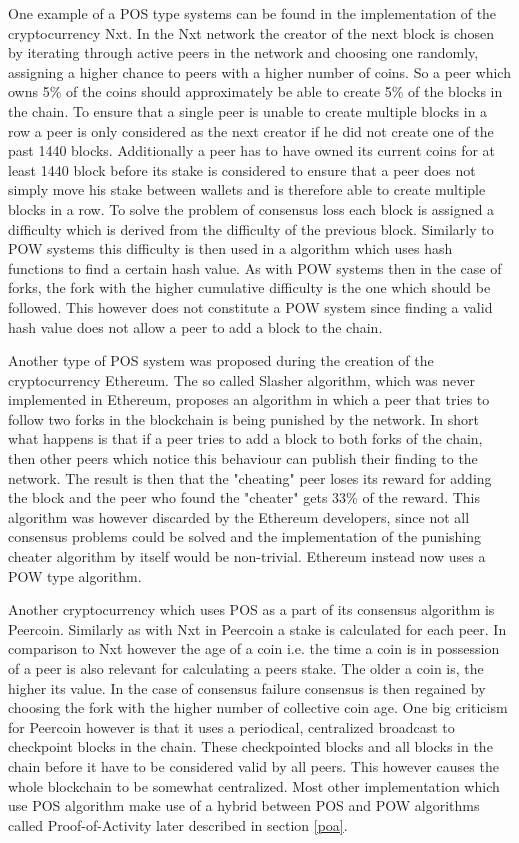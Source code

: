 One example of a POS type systems can be found in the implementation of the cryptocurrency Nxt. In the Nxt network the creator of the next block is chosen by iterating through active peers in the
network and choosing one randomly, assigning a higher chance to peers with a higher number of coins. So a peer which owns 5\% of the coins should approximately be able to create 5\% of the blocks
in the chain. To ensure that a single peer is unable to create multiple blocks in a row a peer is only considered as the next creator if he did not create one of the past 1440 blocks. Additionally
a peer has to have owned its current coins for at least 1440 block before its stake is considered to ensure that a peer does not simply move his stake between wallets and is therefore able to create
multiple blocks in a row. To solve the problem of consensus loss each block is assigned a difficulty which is derived from the difficulty of the previous block. Similarly to POW systems this
difficulty is then used in a algorithm which uses hash functions to find a certain hash value. As with POW systems then in the case of forks, the fork with the higher cumulative difficulty is
the one which should be followed. This however does not constitute a POW system since finding a valid hash value does not allow a peer to add a block to the chain.\cite{url:nxt}\par
Another type of POS system was proposed during the creation of the cryptocurrency Ethereum. The so called Slasher algorithm, which was never implemented in Ethereum, proposes an algorithm in
which a peer that tries to follow two forks in the blockchain is being punished by the network. In short what happens is that if a peer tries to add a block to both forks of the chain, then
other peers which notice this behaviour can publish their finding to the network. The result is then that the "cheating" peer loses its reward for adding the block and the peer who found the
"cheater" gets 33\% of the reward.\cite{url:eth_slash} This algorithm was however discarded by the Ethereum developers, since not all consensus problems could be solved and the implementation of the punishing cheater
algorithm by itself would be non-trivial.\cite{url:eth_no_slash} Ethereum instead now uses a POW type algorithm.\cite{url:eth_pow}\par
Another cryptocurrency which uses POS as a part of its consensus algorithm is Peercoin. Similarly as with Nxt in Peercoin a stake is calculated for each peer. In comparison to Nxt however the age
of a coin i.e. the time a coin is in possession of a peer is also relevant for calculating a peers stake. The older a coin is, the higher its value. In the case of consensus failure consensus is then
regained by choosing the fork with the higher number of collective coin age.\cite{url:peercoin} One big criticism for Peercoin however is that it uses a periodical, centralized broadcast to checkpoint blocks in the chain.
These checkpointed blocks and all blocks in the chain before it have to be considered valid by all peers. This however causes the whole blockchain to be somewhat centralized.
Most other implementation which use POS algorithm make use of a hybrid between POS and POW algorithms called Proof-of-Activity later described in section \ref{poa}.

